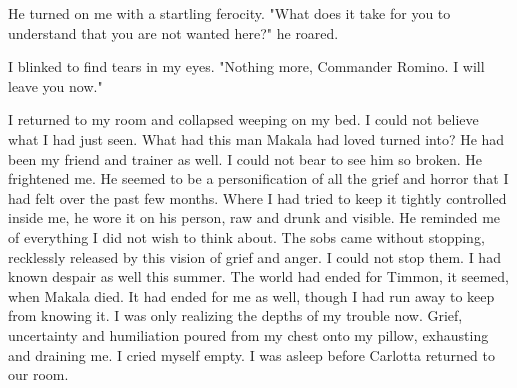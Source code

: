 \documentclass{article}
\begin{document}
He turned on me with a startling ferocity. "What does it take for you to understand that you are not wanted here?" he roared.

I blinked to find tears in my eyes. "Nothing more, Commander Romino. I will leave you now."

I returned to my room and collapsed weeping on my bed. I could not believe what I had just seen. What had this man Makala had loved turned into? He had been my friend and trainer as well. I could not bear to see him so broken. He frightened me. He seemed to be a personification of all the grief and horror that I had felt over the past few months. Where I had tried to keep it tightly controlled inside me, he wore it on his person, raw and drunk and visible. He reminded me of everything I did not wish to think about. The sobs came without stopping, recklessly released by this vision of grief and anger. I could not stop them. I had known despair as well this summer. The world had ended for Timmon, it seemed, when Makala died. It had ended for me as well, though I had run away to keep from knowing it. I was only realizing the depths of my trouble now. Grief, uncertainty and humiliation poured from my chest onto my pillow, exhausting and draining me. I cried myself empty. I was asleep before Carlotta returned to our room.

\vspace{.5cm}
\end{document}

